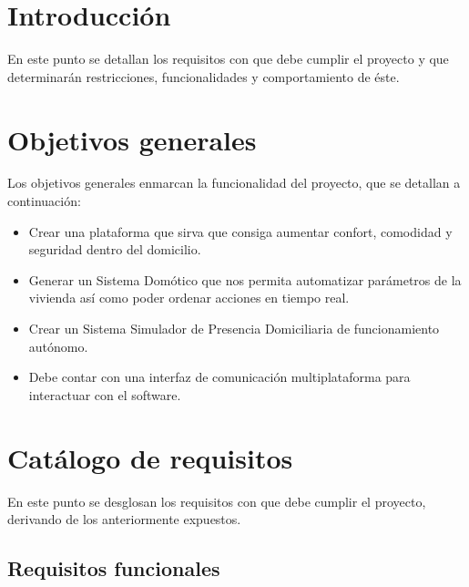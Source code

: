 \section{Introducción}
En este punto se detallan los requisitos con que debe cumplir el proyecto y que determinarán restricciones, funcionalidades y comportamiento de éste. 

\section{Objetivos generales}
Los objetivos generales enmarcan la funcionalidad del proyecto, que se detallan a continuación:
\begin{itemize}
    \item Crear una plataforma que sirva que consiga aumentar confort, comodidad y seguridad dentro del domicilio.
    \item Generar un Sistema Domótico que nos permita automatizar parámetros de la vivienda así como poder ordenar acciones en tiempo real.
    \item Crear un Sistema Simulador de Presencia Domiciliaria de funcionamiento autónomo.
    \item Debe contar con una interfaz de comunicación multiplataforma para interactuar con el software.
\end{itemize}

\section{Catálogo de requisitos}
En este punto se desglosan los requisitos con que debe cumplir el proyecto, derivando de los anteriormente expuestos.

\subsection{\textbf{Requisitos funcionales}}

